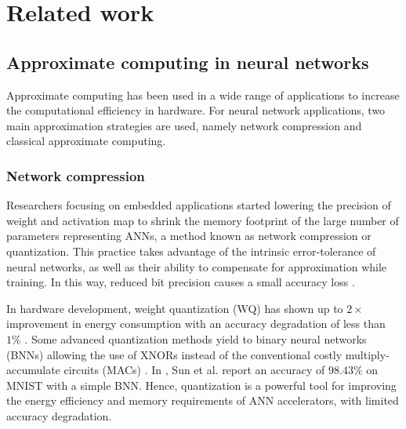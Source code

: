\section{Related work}
\label{sec:related_work}
\subsection{Approximate computing in neural networks}
Approximate computing has been used in a wide range of applications to increase the computational efficiency in hardware\cite{han2013approximate}. For neural network applications, two main approximation strategies are used, namely network compression and classical approximate computing\cite{bouvier2019spiking}.

\subsubsection{Network compression}
Researchers focusing on embedded applications started lowering the precision of weight and activation map to shrink the memory footprint of the large number of parameters representing ANNs, a method known as network compression or quantization. This practice takes advantage of the intrinsic error-tolerance of neural networks, as well as their ability to compensate for approximation while training. In this way, reduced bit precision causes a small accuracy loss \cite{courbariaux2015binaryconnect, han2015deep, hubara2017quantized, rastegari2016xnor}.

In hardware development, weight quantization (WQ) has shown up to $2\times$ improvement in energy consumption with an accuracy degradation of less than $1\%$ \cite{moons20160, whatmough201714}. Some advanced quantization methods yield to binary neural networks (BNNs) allowing the use of XNORs instead of the conventional costly multiply-accumulate circuits (MACs) \cite{rastegari2016xnor}. In \cite{sun2018xnor}, Sun et al. report an accuracy of $98.43\%$ on MNIST with a simple BNN. Hence, quantization is a powerful tool for improving the energy efficiency and memory requirements of ANN accelerators, with limited accuracy degradation.

